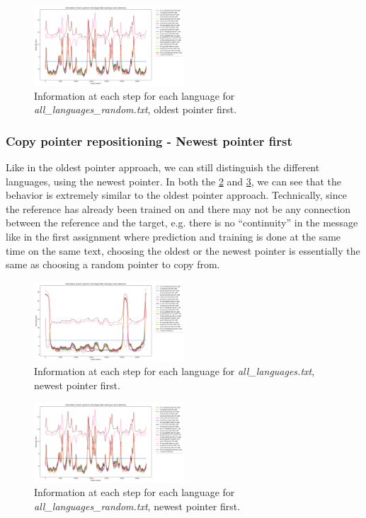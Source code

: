 \documentclass{article}
\begin{document}
\begin{figure}
    \centering
    \includegraphics[width=0.5\textwidth]{../results/all_languages_random/-r_o.png}
    \caption{Information at each step for each language for \textit{all\_languages\_random.txt}, oldest pointer first.}
    \label{fig:all_languages_random_r_o}
\end{figure}

\subsubsection{Copy pointer repositioning - Newest pointer first}
\label{subsubsec:results_locate_lang_newest_pointer_first}

Like in the oldest pointer approach, we can still distinguish the different languages, using the newest pointer.
In both the \ref{fig:all_languages_r_n} and \ref{fig:all_languages_random_r_n}, we can see that the behavior is extremely similar to the oldest pointer approach.
Technically, since the reference has already been trained on and there may not be any connection between the reference and the target, e.g. there is no ``continuity'' in the message like in the first assignment where prediction and training is done at the same time on the same text, choosing the oldest or the newest pointer is essentially the same as choosing a random pointer to copy from.

\begin{figure}
    \centering
    \includegraphics[width=0.5\textwidth]{../results/all_languages/-r_n.png}
    \caption{Information at each step for each language for \textit{all\_languages.txt}, newest pointer first.}
    \label{fig:all_languages_r_n}
\end{figure}

\begin{figure}
    \centering
    \includegraphics[width=0.5\textwidth]{../results/all_languages_random/-r_n.png}
    \caption{Information at each step for each language for \textit{all\_languages\_random.txt}, newest pointer first.}
    \label{fig:all_languages_random_r_n}
\end{figure}
\end{document}
